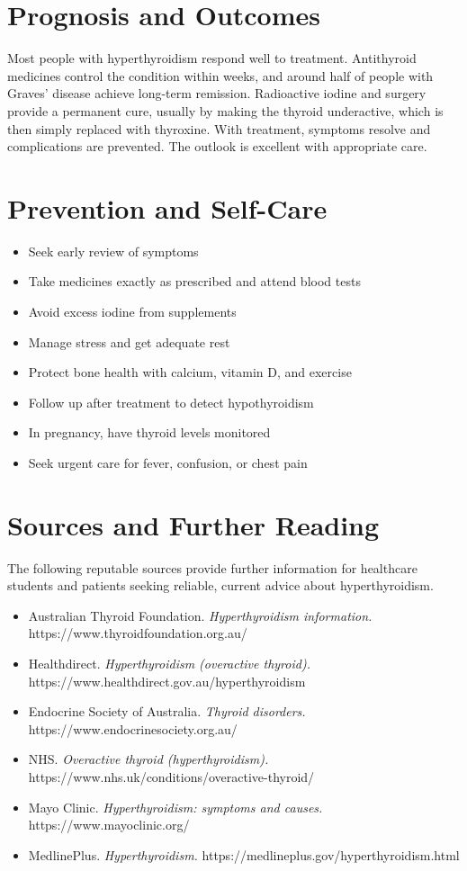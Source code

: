 \section*{Prognosis and Outcomes}
Most people with hyperthyroidism respond well to treatment. Antithyroid medicines control the condition within weeks, and around half of people with Graves' disease achieve long-term remission. Radioactive iodine and surgery provide a permanent cure, usually by making the thyroid underactive, which is then simply replaced with thyroxine. With treatment, symptoms resolve and complications are prevented. The outlook is excellent with appropriate care.

\section*{Prevention and Self-Care}
\begin{itemize}
    \item Seek early review of symptoms
    \item Take medicines exactly as prescribed and attend blood tests
    \item Avoid excess iodine from supplements
    \item Manage stress and get adequate rest
    \item Protect bone health with calcium, vitamin D, and exercise
    \item Follow up after treatment to detect hypothyroidism
    \item In pregnancy, have thyroid levels monitored
    \item Seek urgent care for fever, confusion, or chest pain
\end{itemize}

\section*{Sources and Further Reading}
The following reputable sources provide further information for healthcare students and patients seeking reliable, current advice about hyperthyroidism.

\begin{itemize}
    \item Australian Thyroid Foundation. \textit{Hyperthyroidism information.} https://www.thyroidfoundation.org.au/
    \item Healthdirect. \textit{Hyperthyroidism (overactive thyroid).} https://www.healthdirect.gov.au/hyperthyroidism
    \item Endocrine Society of Australia. \textit{Thyroid disorders.} https://www.endocrinesociety.org.au/
    \item NHS. \textit{Overactive thyroid (hyperthyroidism).} https://www.nhs.uk/conditions/overactive-thyroid/
    \item Mayo Clinic. \textit{Hyperthyroidism: symptoms and causes.} https://www.mayoclinic.org/
    \item MedlinePlus. \textit{Hyperthyroidism.} https://medlineplus.gov/hyperthyroidism.html
\end{itemize}
